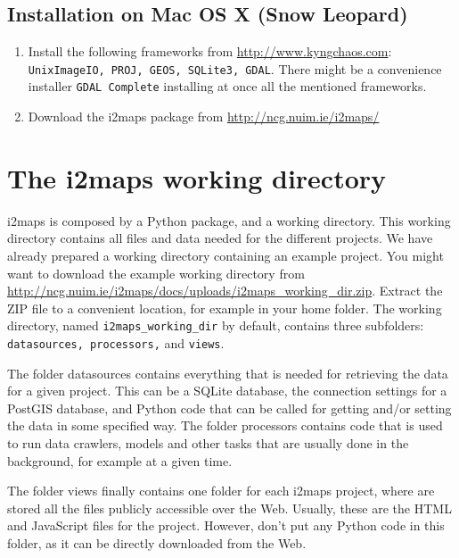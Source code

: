 \documentclass[11pt]{article}
\begin{document}
	
\subsection{Installation on Mac OS X (Snow Leopard)}

\begin{enumerate}
	\item Install the following frameworks from \url{http://www.kyngchaos.com}: \texttt{UnixImageIO, PROJ, GEOS, SQLite3, GDAL}. There might be a convenience installer \verb=GDAL Complete= installing at once all the mentioned frameworks.
	
	\item Download the i2maps package from \url{http://ncg.nuim.ie/i2maps/}
\end{enumerate}





\section{The i2maps working directory}

i2maps is composed by a Python package, and a working directory. This working directory contains all files and data needed for the different projects. We have already prepared a working directory containing an example project. You might want to download the example working directory from \url{http://ncg.nuim.ie/i2maps/docs/uploads/i2maps_working_dir.zip}.
Extract the ZIP file to a convenient location, for example in your home folder. The working directory, named \verb=i2maps_working_dir= by default, contains three subfolders: \texttt{datasources, processors,} and \texttt{views}.

The folder datasources contains everything that is needed for retrieving the data for a given project. This can be a SQLite database, the connection settings for a PostGIS database, and Python code that can be called for getting and/or setting the data in some specified way.
The folder processors contains code that is used to run data crawlers, models and other tasks that are usually done in the background, for example at a given time.

The folder views finally contains one folder for each i2maps project, where are stored all the files publicly accessible over the Web. Usually, these are the HTML and JavaScript files for the project. However, don't put any Python code in this folder, as it can be directly downloaded from the Web.
\end{document}
